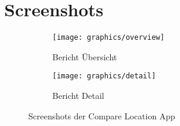\section{Screenshots}

\begin{figure}[ht]
	\centering
	\begin{subfigure}{.4\textwidth}
		\centering
		\texttt{[image: graphics/overview]}
		\caption{Bericht Übersicht}
		\label{fig:overview}
	\end{subfigure}
	\begin{subfigure}{.4\textwidth}
		\centering
		\texttt{[image: graphics/detail]}
		\caption{Bericht Detail}
		\label{fig:detail}
	\end{subfigure}
	\caption{Screenshots der Compare Location App}
\end{figure}
